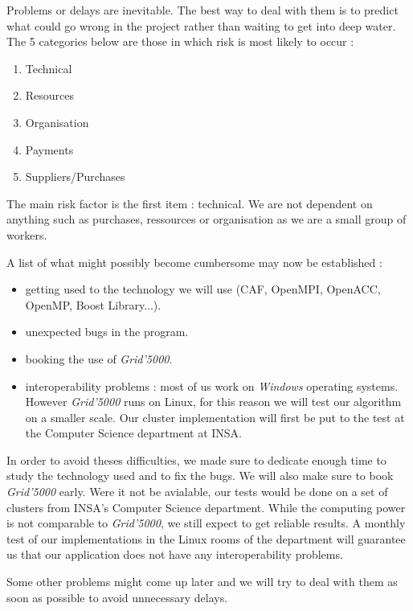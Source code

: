 Problems or delays are inevitable. The best way to deal with them is to predict what could go wrong in the project rather than waiting to get into deep water. The 5 categories below are those in which risk is most likely to occur :
\begin{enumerate}
	\item Technical
	\item Resources
	\item Organisation
	\item Payments
	\item Suppliers/Purchases
\end{enumerate}
The main risk factor is the first item : technical. We are not dependent on anything such as purchases, ressources or organisation as we are a small group of workers.

A list of what might possibly become cumbersome may now be established 	:
\begin{itemize}
	\item getting used to the technology we will use (CAF, OpenMPI, OpenACC, OpenMP, Boost Library...).
	\item unexpected bugs in the program.
	\item booking the use of \textit{Grid'5000}.
	\item interoperability problems : most of us work on \textit{Windows} operating systems. However \textit{Grid'5000} runs on Linux, for this reason we will test our algorithm on a smaller scale. Our cluster implementation will first be put to the test at the Computer Science department at INSA.
\end{itemize}
In order to avoid theses difficulties, we made sure to dedicate enough time to study the technology used and to fix the bugs. We will also make sure to book \textit{Grid'5000} early. Were it not be avialable, our tests would be done on a set of clusters from INSA's Computer Science department. While the computing power is not comparable to \textit{Grid'5000}, we still expect to get reliable results. A monthly test of our implementations in the Linux rooms of the department will guarantee us that our application does not have any interoperability problems.

Some other problems might come up later and we will try to deal with them as soon as possible to avoid unnecessary delays.~\\

